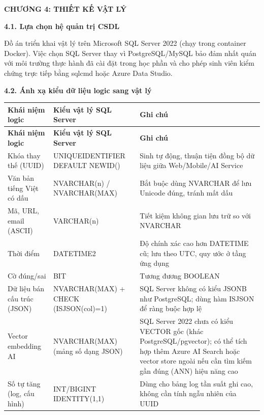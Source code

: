
\clearpage
{}
{}
{\LARGE\bfseries CHƯƠNG 4: THIẾT KẾ VẬT LÝ}\par\vspace{1em}

{}
{\Large\bfseries 4.1. Lựa chọn hệ quản trị CSDL}\par\vspace{0.7em}

Đồ án triển khai vật lý trên Microsoft SQL Server 2022 (chạy trong container Docker). Việc chọn SQL Server thay vì PostgreSQL/MySQL bảo đảm nhất quán với môi trường thực hành đã cài đặt trong học phần và cho phép sinh viên kiểm chứng trực tiếp bằng sqlcmd hoặc Azure Data Studio.

{}
{\Large\bfseries 4.2. Ánh xạ kiểu dữ liệu logic sang vật lý}\par\vspace{0.7em}

\begin{longtable}{|p{}|p{}|p{}|}
\hline
\textbf{Khái niệm logic} & \textbf{Kiểu vật lý SQL Server} & \textbf{Ghi chú} \\ \hline
\endfirsthead
\hline
\textbf{Khái niệm logic} & \textbf{Kiểu vật lý SQL Server} & \textbf{Ghi chú} \\ \hline
\endhead
Khóa thay thế (UUID) & UNIQUEIDENTIFIER DEFAULT NEWID() & Sinh tự động, thuận tiện đồng bộ dữ liệu giữa Web/Mobile/AI Service \\ \hline
Văn bản tiếng Việt có dấu & NVARCHAR(n) / NVARCHAR(MAX) & Bắt buộc dùng NVARCHAR để lưu Unicode đúng, tránh mất dấu \\ \hline
Mã, URL, email (ASCII) & VARCHAR(n) & Tiết kiệm không gian lưu trữ so với NVARCHAR \\ \hline
Thời điểm & DATETIME2 & Độ chính xác cao hơn DATETIME cũ; lưu theo UTC, quy ước ở tầng ứng dụng \\ \hline
Cờ đúng/sai & BIT & Tương đương BOOLEAN \\ \hline
Dữ liệu bán cấu trúc (JSON) & NVARCHAR(MAX) + CHECK (ISJSON(col)=1) & SQL Server không có kiểu JSONB như PostgreSQL; dùng hàm ISJSON để ràng buộc hợp lệ \\ \hline
Vector embedding AI & NVARCHAR(MAX) (mảng số dạng JSON) & SQL Server 2022 chưa có kiểu VECTOR gốc (khác PostgreSQL/pgvector); có thể tích hợp thêm Azure AI Search hoặc vector store ngoài nếu cần tìm kiếm gần đúng (ANN) hiệu năng cao \\ \hline
Số tự tăng (log, cấu hình) & INT/BIGINT IDENTITY(1,1) & Dùng cho bảng log tần suất ghi cao, không cần tính ngẫu nhiên của UUID \\ \hline
\end{longtable}


